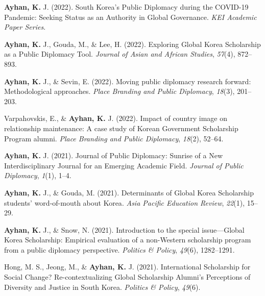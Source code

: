 \documentclass[11pt,a4paper,]{awesome-cv}
\begin{document}
\leavevmode{}%
\textbf{Ayhan, K.} J. (2022). South {Korea}'s {Public} {Diplomacy}
during the {COVID}-19 {Pandemic}: {Seeking} {Status} as an {Authority}
in {Global} {Governance}. \emph{KEI Academic Paper Series}.

\leavevmode{}%
\textbf{Ayhan, K.} J., Gouda, M., \& Lee, H. (2022). Exploring {Global}
{Korea} {Scholarship} as a {Public} {Diplomacy} {Tool}. \emph{Journal of
Asian and African Studies}, \emph{57}(4), 872--893.

\leavevmode{}%
\textbf{Ayhan, K.} J., \& Sevin, E. (2022). Moving public diplomacy
research forward: Methodological approaches. \emph{Place Branding and
Public Diplomacy}, \emph{18}(3), 201--203.

\leavevmode{}%
Varpahovskis, E., \& \textbf{Ayhan, K.} J. (2022). Impact of country
image on relationship maintenance: A case study of {Korean} {Government}
{Scholarship} {Program} alumni. \emph{Place Branding and Public
Diplomacy}, \emph{18}(2), 52--64.

\leavevmode{}%
\textbf{Ayhan, K.} J. (2021). Journal of {Public} {Diplomacy}: {Sunrise}
of a {New} {Interdisciplinary} {Journal} for an {Emerging} {Academic}
{Field}. \emph{Journal of Public Diplomacy}, \emph{1}(1), 1--4.

\leavevmode{}%
\textbf{Ayhan, K.} J., \& Gouda, M. (2021). Determinants of {Global}
{Korea} {Scholarship} students' word-of-mouth about {Korea}. \emph{Asia
Pacific Education Review}, \emph{22}(1), 15--29.

\leavevmode{}%
\textbf{Ayhan, K.} J., \& Snow, N. (2021). Introduction to the special
issue---{Global} {Korea} {Scholarship}: {Empirical} evaluation of a
non-{Western} scholarship program from a public diplomacy perspective.
\emph{Politics \& Policy}, \emph{49}(6), 1282--1291.

\leavevmode{}%
Hong, M. S., Jeong, M., \& \textbf{Ayhan, K.} J. (2021). International
{Scholarship} for {Social} {Change}? {Re}-contextualizing {Global}
{Scholarship} {Alumni}'s {Perceptions} of {Diversity} and {Justice} in
{South} {Korea}. \emph{Politics \& Policy}, \emph{49}(6).
\end{document}
